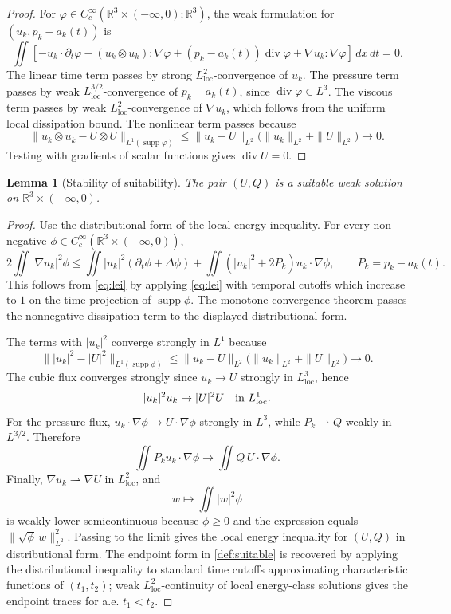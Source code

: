 \documentclass[11pt]{amsart}
\theoremstyle{plain}
\newtheorem{lemma}[theorem]{Lemma}
\theoremstyle{definition}
\theoremstyle{remark}
\numberwithin{equation}{section}
\newcommand{\R}{\mathbb R}
\newcommand{\loc}{\mathrm{loc}}
\newcommand{\supp}{\operatorname{supp}}
\newcommand{\divergence}{\operatorname{div}}
\begin{document}
\begin{proof}
For \(\varphi\in C_c^\infty(\R^3\times(-\infty,0);\R^3)\), the weak
formulation for \((u_k,p_k-a_k(t))\) is
\[
   \iint\left[
      -u_k\cdot\partial_t\varphi
      -(u_k\otimes u_k):\nabla\varphi
      +(p_k-a_k(t))\divergence\varphi
      +\nabla u_k:\nabla\varphi
   \right]\,dx\,dt=0.
\]
The linear time term passes by strong \(L^2_{\loc}\)-convergence of \(u_k\).
The pressure term passes by weak \(L^{3/2}_{\loc}\)-convergence of
\(p_k-a_k(t)\), since \(\divergence\varphi\in L^3\).  The viscous term passes
by weak \(L^2_{\loc}\)-convergence of \(\nabla u_k\), which follows from the
uniform local dissipation bound.  The nonlinear term
passes because
\[
   \|u_k\otimes u_k-U\otimes U\|_{L^1(\supp\varphi)}
   \le
   \|u_k-U\|_{L^2}
   \bigl(\|u_k\|_{L^2}+\|U\|_{L^2}\bigr)\to0.
\]
Testing with gradients of scalar functions gives \(\divergence U=0\).
\end{proof}

\begin{lemma}[Stability of suitability]\label{lem:suitability}
The pair \((U,Q)\) is a suitable weak solution on
\(\R^3\times(-\infty,0)\).
\end{lemma}

\begin{proof}
Use the distributional form of the local energy inequality.  For every
non-negative \(\phi\in C_c^\infty(\R^3\times(-\infty,0))\),
\[
   2\iint |\nabla u_k|^2\phi
   \le
   \iint |u_k|^2(\partial_t\phi+\Delta\phi)
   +\iint (|u_k|^2+2P_k)u_k\cdot\nabla\phi ,
   \qquad P_k=p_k-a_k(t).
\]
This follows from \eqref{eq:lei} by applying \eqref{eq:lei} with temporal
cutoffs which increase to \(1\) on the time projection of \(\supp\phi\).  The
monotone convergence theorem passes the nonnegative dissipation term to the
displayed distributional form.

The terms with \(|u_k|^2\) converge strongly in \(L^1\) because
\[
   \||u_k|^2-|U|^2\|_{L^1(\supp\phi)}
   \le
   \|u_k-U\|_{L^2}
   \bigl(\|u_k\|_{L^2}+\|U\|_{L^2}\bigr)\to0.
\]
The cubic flux converges strongly since \(u_k\to U\) strongly in
\(L^3_{\loc}\), hence
\[
   |u_k|^2u_k\to |U|^2U
   \quad\hbox{in }L^1_{\loc}.
\]
For the pressure flux, \(u_k\cdot\nabla\phi\to U\cdot\nabla\phi\) strongly in
\(L^3\), while \(P_k\rightharpoonup Q\) weakly in \(L^{3/2}\).  Therefore
\[
   \iint P_k u_k\cdot\nabla\phi\to
   \iint Q\,U\cdot\nabla\phi .
\]
Finally,
\(\nabla u_k\rightharpoonup\nabla U\) in \(L^2_{\loc}\), and
\[
   w\mapsto\iint |w|^2\phi
\]
is weakly lower semicontinuous because \(\phi\ge0\) and the expression equals
\(\|\sqrt{\phi}\,w\|_{L^2}^2\).  Passing to the limit gives the local energy
inequality for \((U,Q)\) in distributional form.  The endpoint form in
\cref{def:suitable} is recovered by applying the distributional inequality to
standard time cutoffs approximating characteristic functions of
\((t_1,t_2)\); weak \(L^2_{\loc}\)-continuity of local energy-class solutions
gives the endpoint traces for a.e. \(t_1<t_2\).
\end{proof}
\end{document}
